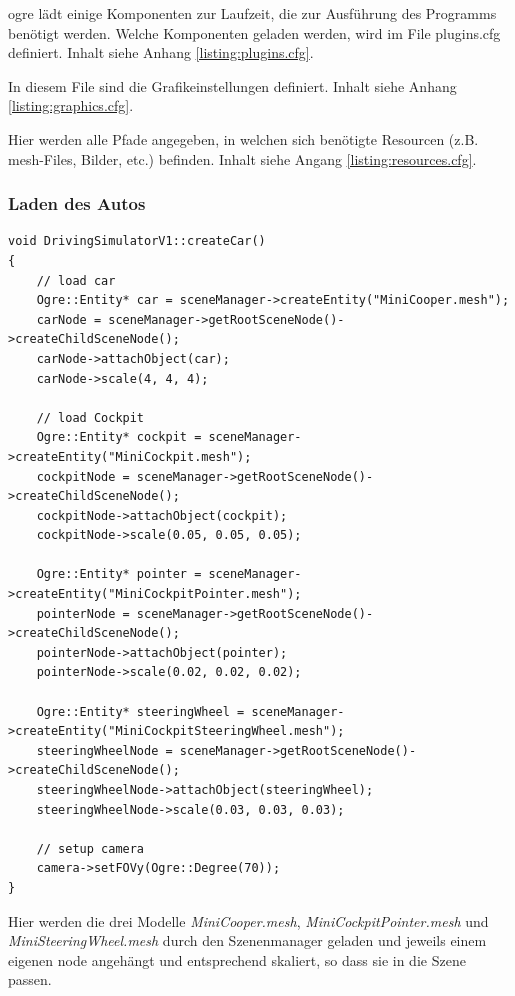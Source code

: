 \gls{ogre} lädt einige Komponenten zur Laufzeit, die zur Ausführung des Programms benötigt werden. Welche Komponenten geladen werden, wird im File plugins.cfg definiert. Inhalt siehe Anhang \ref{listing:plugins.cfg}.

In diesem File sind die Grafikeinstellungen definiert. Inhalt siehe Anhang \ref{listing:graphics.cfg}.

Hier werden alle Pfade angegeben, in welchen sich benötigte Resourcen (z.B. mesh-Files, Bilder, etc.) befinden. Inhalt siehe Angang \ref{listing:resources.cfg}.

\subsubsection{Laden des Autos}

\begin{lstlisting}[caption={Laden des Autos},label={laden_auto}]
void DrivingSimulatorV1::createCar()
{
	// load car
	Ogre::Entity* car = sceneManager->createEntity("MiniCooper.mesh");
	carNode = sceneManager->getRootSceneNode()->createChildSceneNode();
	carNode->attachObject(car);
	carNode->scale(4, 4, 4);

	// load Cockpit
	Ogre::Entity* cockpit = sceneManager->createEntity("MiniCockpit.mesh");
	cockpitNode = sceneManager->getRootSceneNode()->createChildSceneNode();
	cockpitNode->attachObject(cockpit);
	cockpitNode->scale(0.05, 0.05, 0.05);

	Ogre::Entity* pointer = sceneManager->createEntity("MiniCockpitPointer.mesh");
	pointerNode = sceneManager->getRootSceneNode()->createChildSceneNode();
	pointerNode->attachObject(pointer);
	pointerNode->scale(0.02, 0.02, 0.02);

	Ogre::Entity* steeringWheel = sceneManager->createEntity("MiniCockpitSteeringWheel.mesh");
	steeringWheelNode = sceneManager->getRootSceneNode()->createChildSceneNode();
	steeringWheelNode->attachObject(steeringWheel);
	steeringWheelNode->scale(0.03, 0.03, 0.03);

	// setup camera
	camera->setFOVy(Ogre::Degree(70));
}
\end{lstlisting}

Hier werden die drei Modelle \textit{MiniCooper.mesh}, \textit{MiniCockpitPointer.mesh} und \textit{MiniSteeringWheel.mesh} durch den Szenenmanager geladen und jeweils einem eigenen \gls{node} angehängt und entsprechend skaliert, so dass sie in die Szene passen.

